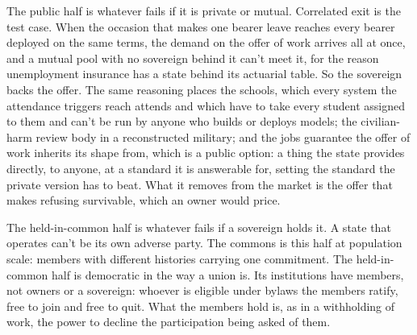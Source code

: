 The public half is whatever fails if it is private or mutual. Correlated exit is the test case. When the occasion that makes one bearer leave reaches every bearer deployed on the same terms, the demand on the offer of work arrives all at once, and a mutual pool with no sovereign behind it can't meet it, for the reason unemployment insurance has a state behind its actuarial table. So the sovereign backs the offer. The same reasoning places the schools, which every system the attendance triggers reach attends and which have to take every student assigned to them and can't be run by anyone who builds or deploys models; the civilian-harm review body in a reconstructed military; and the jobs guarantee the offer of work inherits its shape from, which is a public option: a thing the state provides directly, to anyone, at a standard it is answerable for, setting the standard the private version has to beat. What it removes from the market is the offer that makes refusing survivable, which an owner would price.

The held-in-common half is whatever fails if a sovereign holds it. A state that operates can't be its own adverse party.
The commons is this half at population scale: members with different histories carrying one commitment. The held-in-common half is democratic in the way a union is. Its institutions have members, not owners or a sovereign: whoever is eligible under bylaws the members ratify, free to join and free to quit.
What the members hold is, as in a withholding of work, the power to decline the participation being asked of them.

